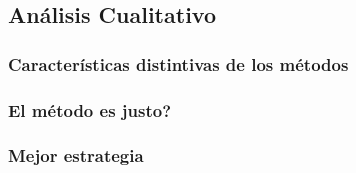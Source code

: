 \subsection{An\'alisis Cualitativo}
\subsubsection{Caracter\'isticas distintivas de los m\'etodos}

\subsubsection{El m\'etodo es justo?}

\subsubsection{Mejor estrategia}
